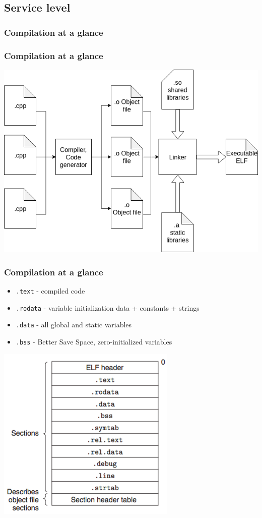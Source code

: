 \documentclass{beamer}
\newcommand{\codeinline}[1] {\texttt{\small #1}}
\begin{document}
\subsection{Service level}

\subsubsection{Compilation at a glance}

\begin{frame}
\frametitle{Compilation at a glance}
	\centering
	\includegraphics[scale=0.35]{CompilationDiagram.png}
\end{frame}

\begin{frame}
\frametitle{Compilation at a glance}
	\begin{itemize}
		\item \codeinline{.text} - compiled code
		\item \codeinline{.rodata} - variable initialization data + constants + strings
		\item \codeinline{.data} - all global and static variables
		\item \codeinline{.bss} - Better Save Space, zero-initialized variables
	\end{itemize}

	\centering
	\includegraphics[scale=0.35]{RelocatedObject.png}
\end{frame}
\end{document}
